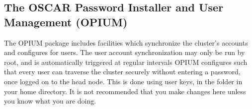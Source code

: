 %
%
%

\subsection{The OSCAR Password Installer and User Management (OPIUM)}
\label{app:opium-overview}

The OPIUM package includes facilities which synchronize the cluster's
accounts and configures  for users.  The user account
synchronization may only be run by root, and is automatically
triggered at regular intervals
OPIUM configures  such that every user can traverse the
cluster securely without entering a password, once logged on to the
head node.  This is done using  user keys, in the 
folder in your home directory.  It is not recommended that you make
changes here unless you know what you are doing.
